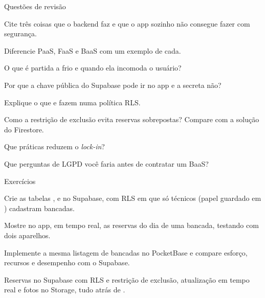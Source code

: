 \documentclass[aspectratio=169,10pt]{beamer}
\begin{document}
\begin{frame}{Questões de revisão}
  \begin{questoes}
    \item Cite três coisas que o backend faz e que o app sozinho não consegue fazer com segurança.
    \item Diferencie PaaS, FaaS e BaaS com um exemplo de cada.
    \item O que é partida a frio e quando ela incomoda o usuário?
    \item Por que a chave pública do Supabase pode ir no app e a secreta não?
    \item Explique o que  e  fazem numa política RLS.
    \item Como a restrição de exclusão evita reservas sobrepostas? Compare com a solução do Firestore.
    \item Que práticas reduzem o \emph{lock-in}?
    \item Que perguntas de LGPD você faria antes de contratar um BaaS?
  \end{questoes}
\end{frame}

\begin{frame}{Exercícios}
  \begin{exercicio}
    Crie as tabelas ,  e  no Supabase, com RLS em que só técnicos (papel guardado em ) cadastram bancadas.
  \end{exercicio}
  \begin{exercicio}
    Mostre no app, em tempo real, as reservas do dia de uma bancada, testando com dois aparelhos.
  \end{exercicio}
  \begin{exercicio}
    Implemente a mesma listagem de bancadas no PocketBase e compare esforço, recursos e desempenho com o Supabase.
  \end{exercicio}
  \begin{projeto}
    Reservas no Supabase com RLS e restrição de exclusão, atualização em tempo real e fotos no Storage, tudo atrás de .
  \end{projeto}
\end{frame}
\end{document}
